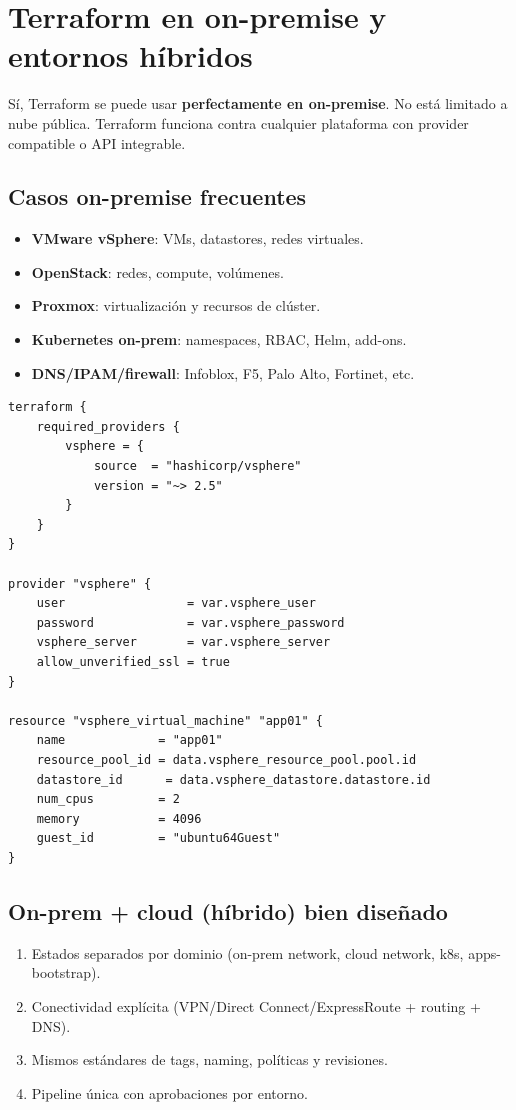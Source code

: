 \documentclass[12pt,a4paper]{article}
\begin{document}
\section{Terraform en on-premise y entornos híbridos}

Sí, Terraform se puede usar \textbf{perfectamente en on-premise}. No está limitado a nube pública.
Terraform funciona contra cualquier plataforma con provider compatible o API integrable.

\subsection{Casos on-premise frecuentes}
\begin{itemize}
		\item \textbf{VMware vSphere}: VMs, datastores, redes virtuales.
		\item \textbf{OpenStack}: redes, compute, volúmenes.
		\item \textbf{Proxmox}: virtualización y recursos de clúster.
		\item \textbf{Kubernetes on-prem}: namespaces, RBAC, Helm, add-ons.
		\item \textbf{DNS/IPAM/firewall}: Infoblox, F5, Palo Alto, Fortinet, etc.
\end{itemize}

\begin{lstlisting}[caption=Ejemplo básico on-prem con vSphere]
terraform {
	required_providers {
		vsphere = {
			source  = "hashicorp/vsphere"
			version = "~> 2.5"
		}
	}
}

provider "vsphere" {
	user                 = var.vsphere_user
	password             = var.vsphere_password
	vsphere_server       = var.vsphere_server
	allow_unverified_ssl = true
}

resource "vsphere_virtual_machine" "app01" {
	name             = "app01"
	resource_pool_id = data.vsphere_resource_pool.pool.id
	datastore_id      = data.vsphere_datastore.datastore.id
	num_cpus         = 2
	memory           = 4096
	guest_id         = "ubuntu64Guest"
}
\end{lstlisting}

\subsection{On-prem + cloud (híbrido) bien diseñado}
\begin{enumerate}
		\item Estados separados por dominio (on-prem network, cloud network, k8s, apps-bootstrap).
		\item Conectividad explícita (VPN/Direct Connect/ExpressRoute + routing + DNS).
		\item Mismos estándares de tags, naming, políticas y revisiones.
		\item Pipeline única con aprobaciones por entorno.
\end{enumerate}
\end{document}
